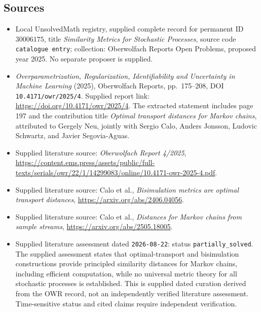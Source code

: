 \documentclass[11pt]{article}
\begin{document}
\subsection{Sources}
\begin{itemize}
\item Local UnsolvedMath registry, supplied complete record for permanent ID \(30006175\), title \emph{Similarity Metrics for Stochastic Processes}, source code \texttt{catalogue entry}; collection: Oberwolfach Reports Open Problems, proposed year 2025. No separate proposer is supplied.
\item \emph{Overparametrization, Regularization, Identifiability and Uncertainty in Machine Learning} (2025), Oberwolfach Reports, pp.\ 175--208, DOI \texttt{10.4171/owr/2025/4}. Supplied report link: \url{https://doi.org/10.4171/owr/2025/4}. The extracted statement includes page 197 and the contribution title \emph{Optimal transport distances for Markov chains}, attributed to Gergely Neu, jointly with Sergio Calo, Anders Jonsson, Ludovic Schwartz, and Javier Segovia-Aguas.
\item Supplied literature source: \emph{Oberwolfach Report 4/2025}, \url{https://content.ems.press/assets/public/full-texts/serials/owr/22/1/14299083/online/10.4171-owr-2025-4.pdf}.
\item Supplied literature source: Calo et al., \emph{Bisimulation metrics are optimal transport distances}, \url{https://arxiv.org/abs/2406.04056}.
\item Supplied literature source: Calo et al., \emph{Distances for Markov chains from sample streams}, \url{https://arxiv.org/abs/2505.18005}.
\item Supplied literature assessment dated \texttt{2026-08-22}: status \texttt{partially\_solved}. The supplied assessment states that optimal-transport and bisimulation constructions provide principled similarity distances for Markov chains, including efficient computation, while no universal metric theory for all stochastic processes is established. This is supplied dated curation derived from the OWR record, not an independently verified literature assessment. Time-sensitive status and cited claims require independent verification.
\end{itemize}
\end{document}
